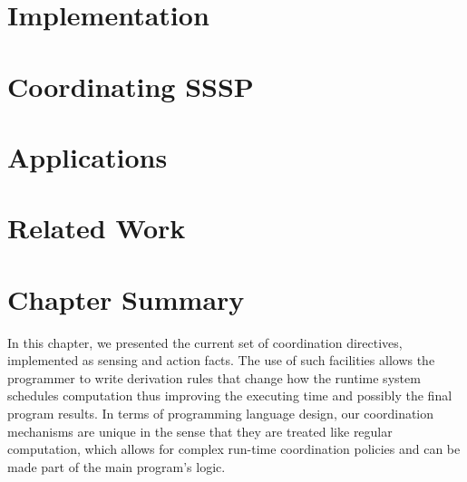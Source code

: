 \section{Implementation}


\section{Coordinating SSSP}


\section{Applications}



\section{Related Work}\label{sec:coordination:related}

\section{Chapter Summary}

In this chapter, we presented the current set of coordination directives,
implemented as sensing and action facts. The use of such facilities allows the
programmer to write derivation rules that change how the runtime system
schedules computation thus improving the executing time and possibly the final
program results. In terms of programming language design, our coordination
mechanisms are unique in the sense that they are treated like regular
computation, which allows for complex run-time coordination policies and can be
made part of the main program's logic.
